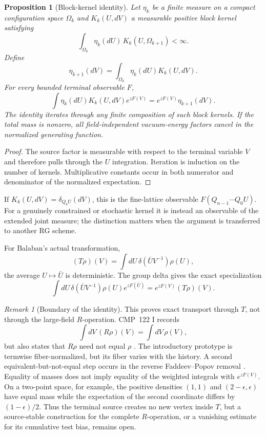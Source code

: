 \documentclass[11pt]{article}
\newtheorem{proposition}[theorem]{Proposition}
\theoremstyle{definition}
\theoremstyle{remark}
\newtheorem{remark}[theorem]{Remark}
\begin{document}
\begin{proposition}[Block-kernel identity]\label{prop:block}
Let $\eta_k$ be a finite measure on a compact configuration space $\Omega_k$
and $K_k(U,dV)$ a measurable positive block kernel satisfying
\[
 \int_{\Omega_k}\eta_k(dU)\,K_k(U,\Omega_{k+1})<\infty.
\]
Define
\[
 \eta_{k+1}(dV)=\int_{\Omega_k}\eta_k(dU)K_k(U,dV).
\]
For every bounded terminal observable $F$,
\[
 \int\eta_k(dU)K_k(U,dV)e^{zF(V)}
 =e^{zF(V)}\eta_{k+1}(dV).
\]
The identity iterates through any finite composition of such block kernels.  If
the total mass is nonzero, all field-independent vacuum-energy factors cancel in
the normalized generating function.
\end{proposition}

\begin{proof}
The source factor is measurable with respect to the terminal variable $V$ and
therefore pulls through the $U$ integration.  Iteration is induction on the
number of kernels.  Multiplicative constants occur in both numerator and
denominator of the normalized expectation.
\end{proof}

If $K_k(U,dV)=\delta_{Q_kU}(dV)$, this is the fine-lattice observable
$F(Q_{n-1}\cdots Q_0U)$.  For a genuinely constrained or stochastic kernel it
is instead an observable of the extended joint measure; the distinction matters
when the argument is transferred to another RG scheme.

For Balaban's actual transformation,
\[
 (T\rho)(V)=\int dU\,\delta(\bar U V^{-1})\rho(U),
\]
the average $U\mapsto\bar U$ is deterministic.  The group delta gives the exact
specialization
\[
 \int dU\,\delta(\bar U V^{-1})\rho(U)e^{zF(\bar U)}
 =e^{zF(V)}(T\rho)(V).
\]

\begin{remark}[Boundary of the identity]
This proves exact transport through $T$, not through the large-field
$R$-operation.  CMP~122 I records
\[
 \int dV\,(R\rho)(V)=\int dV\,\rho(V),
\]
but also states that $R\rho$ need not equal $\rho$
\cite[Eq.~(0.4), pp.~176, 193--194, 200--201]{Balaban1989LargeI}.  The
introductory prototype is termwise fiber-normalized, but its fiber varies with
the history.  A second equivalent-but-not-equal step occurs in the reverse
Faddeev--Popov removal \cite[p.~378]{Balaban1989LargeII}.  Equality of masses
does not imply equality of the weighted integrals with $e^{zF(V)}$.  On a two-point
space, for example, the positive densities $(1,1)$ and
$(2-\epsilon,\epsilon)$ have equal mass while the expectation of the second
coordinate differs by $(1-\epsilon)/2$.  Thus the terminal source creates no
new vertex inside $T$, but a source-stable construction for the complete
$R$-operation, or a vanishing estimate for its cumulative test bias, remains
open.
\end{remark}
\end{document}
